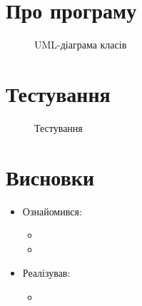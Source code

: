 \documentclass[../../document]{subfiles}
\begin{document}
	\chapter{Про програму}

	\begin{figure}[htb]
		\centering
		\caption{UML-діаграма класів}
		\label{fig:classdiagram}
	\end{figure}

	\chapter{Тестування}
	\begin{figure}[htb]
		\centering
		\caption{Тестування}
		\label{fig:tag}
	\end{figure}

	\chapter{Висновки}
	\begin{itemize}
		\item Ознайомився:
			\begin{itemize}
				\item
				\item
			\end{itemize}
		\item Реалізував:
			\begin{itemize}
				\item
			\end{itemize}
	\end{itemize}
\end{document}
